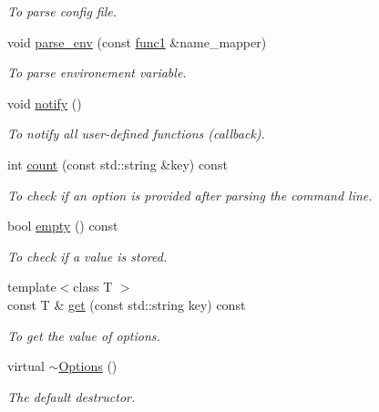 \begin{DoxyCompactItemize}
\begin{DoxyCompactList}\small\item\em To parse config file. \item\end{DoxyCompactList}\item 
void \hyperlink{classOptions_a2b7bc0da71a508d8b03703a045e3ee8c}{parse\_\-env} (const \hyperlink{Options_8hpp_a3e992ba9ff50fb8a17ae2d36ea9b3f80}{func1} \&name\_\-mapper)
\begin{DoxyCompactList}\small\item\em To parse environement variable. \item\end{DoxyCompactList}\item 
\hypertarget{classOptions_ac3c10bdaf1149f4a6ff45245a67d9948}{
void \hyperlink{classOptions_ac3c10bdaf1149f4a6ff45245a67d9948}{notify} ()}
\label{classOptions_ac3c10bdaf1149f4a6ff45245a67d9948}

\begin{DoxyCompactList}\small\item\em To notify all user-\/defined functions (callback). \item\end{DoxyCompactList}\item 
int \hyperlink{classOptions_ac4172898028eda1e46fc53043729906f}{count} (const std::string \&key) const 
\begin{DoxyCompactList}\small\item\em To check if an option is provided after parsing the command line. \item\end{DoxyCompactList}\item 
\hypertarget{classOptions_a8a7550b7c30cfc130d3545329512dc94}{
bool \hyperlink{classOptions_a8a7550b7c30cfc130d3545329512dc94}{empty} () const }
\label{classOptions_a8a7550b7c30cfc130d3545329512dc94}

\begin{DoxyCompactList}\small\item\em To check if a value is stored. \item\end{DoxyCompactList}\item 
{\footnotesize template$<$class T $>$ }\\const T \& \hyperlink{classOptions_ac38ac6753b19140073a33d2b3da5229c}{get} (const std::string key) const 
\begin{DoxyCompactList}\small\item\em To get the value of options. \item\end{DoxyCompactList}\item 
\hypertarget{classOptions_afa785625cf3c12ee5171e59158c554b0}{
virtual \hyperlink{classOptions_afa785625cf3c12ee5171e59158c554b0}{$\sim$Options} ()}
\label{classOptions_afa785625cf3c12ee5171e59158c554b0}

\begin{DoxyCompactList}\small\item\em The default destructor. \item\end{DoxyCompactList}\end{DoxyCompactItemize}
